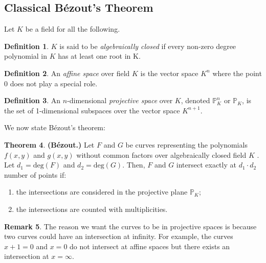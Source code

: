 \documentclass[]{article}
\theoremstyle{definition}
\numberwithin{equation}{section}
\newtheorem{thm}{Theorem}[section]
\newtheorem{defn}[thm]{Definition}
\newtheorem{rmk}[thm]{Remark}
\renewcommand{\.}{\,.}
\begin{document}
\subsection{Classical B\'ezout's Theorem}
\hspace{3mm} Let $K$ be a field for all the following.
\begin{defn} $K$ is said to be \emph{algebraically closed} if every non-zero degree polynomial in $K$ has at least one root in K.
\end{defn}
\begin{defn} An \emph{affine space} over field $K$ is the vector space $K^n$ where the point 0 does not play a special role.
\end{defn}
\begin{defn} An $n$-dimensional \emph{projective space} over $K$, denoted $\mathbb{P}^n_K$ or $\mathbb{P}_K$, is the set of 1-dimensional subspaces over the vector space $K^{n+1}$.
\end{defn}
\hspace{3mm} We now state B\'ezout's theorem:
\begin{thm} \textbf{(B\'ezout.)}
	Let $F$ and $G$ be curves representing the polynomials $f(x,y)$ and $g(x,y)$ without common factors over algebraically closed field $K$ . Let $d_1=\textrm{deg}(F)$ and $d_2=\textrm{deg}(G)$. Then, $F$ and $G$ intersect exactly at $d_1\cdot d_2$ number of points if:
	\begin{enumerate}[noitemsep,topsep=-6pt]
		\item \vspace{0.75mm}
		the intersections are considered in the projective plane $\mathbb{P}_K$;
		\vspace{2mm}
		\item the intersections are counted with multiplicities.
	\end{enumerate}
\end{thm}
\begin{rmk}
	The reason we want the curves to be in projective spaces is because two curves could have an intersection at infinity. For example, the curves $x+1=0$ and $x=0$ do not intersect at affine spaces but there exists an intersection at $x=\infty$.
\end{rmk}
\end{document}

